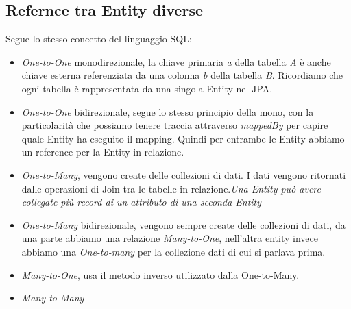 \subsection{Refernce tra Entity diverse}
Segue lo stesso concetto del linguaggio SQL:
\begin{itemize} 
    \item \textit{One-to-One} monodirezionale, la chiave primaria \textit{a} della tabella \textit{A} è anche chiave esterna referenziata da una colonna \textit{b} della tabella \textit{B}. Ricordiamo che ogni tabella è rappresentata da una singola Entity nel JPA.
    \item \textit{One-to-One} bidirezionale, segue lo stesso principio della mono, con la particolarità che possiamo tenere traccia attraverso \textit{mappedBy} per capire quale Entity ha eseguito il mapping. Quindi per entrambe le Entity abbiamo un reference per la Entity in relazione. 
    \item \textit{One-to-Many}, vengono create delle collezioni di dati. I dati vengono ritornati dalle operazioni di Join tra le tabelle in relazione.\textit{Una Entity può avere collegate più record di un attributo di una seconda Entity}
    \item \textit{One-to-Many} bidirezionale, vengono sempre create delle collezioni di dati, da una parte abbiamo una relazione \textit{Many-to-One}, nell'altra entity invece abbiamo una \textit{One-to-many} per la collezione dati di cui si parlava prima. 
    \item \textit{Many-to-One}, usa il metodo inverso utilizzato dalla One-to-Many. 
    \item \textit{Many-to-Many}
\end{itemize}

